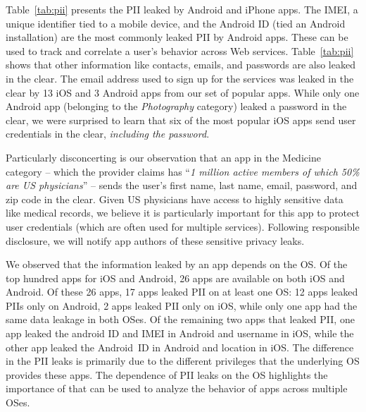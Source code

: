 Table~\ref{tab:pii} presents the PII leaked by Android and iPhone apps. 
The IMEI, a unique identifier tied to a mobile device, and the Android ID (tied an Android installation) are the most commonly leaked PII by Android apps.  
These can be used to track and correlate a user's behavior across Web services. 
Table~\ref{tab:pii} shows that other information like contacts, emails, and passwords are also leaked in the clear. 
The email address used to sign up for the services was leaked in the clear by 13 iOS and 3 Android apps from our set of popular apps.
While only one Android app (belonging to the \emph{Photography} category) leaked a password in the clear, we were surprised to learn that six of the most popular iOS apps send user credentials in the clear, \emph{including the password}. 

Particularly disconcerting is our observation that an app in the Medicine category -- which the provider claims has ``\emph{1 million active members of which 50\% are US physicians}'' -- sends the user's first name, last name, email, password, and zip code in the clear. 
Given US physicians have access to highly sensitive data like medical records, we believe it is particularly important for this app to protect user credentials (which are often used for multiple services). 
Following responsible disclosure, we will notify app authors of these sensitive privacy leaks. 

We observed that the information leaked by an app depends on the OS.
Of the top hundred apps for iOS and Android, 26 apps are available on both iOS and Android. 
Of these 26 apps, 17 apps leaked PII on at least one OS: 12 apps leaked PIIs only on Android, 2 apps leaked PII only on iOS, while only one app had the same data leakage in both OSes.
Of the remaining two apps that leaked PII, one app leaked the android ID and IMEI in Android and username in iOS, while the other app leaked the Android~ID in Android and location in iOS. 
The difference in the PII leaks is primarily due to the different privileges that the underlying OS provides these apps. 
The dependence of PII leaks on the OS highlights the importance of \meddle that can be used to analyze the behavior of apps across multiple OSes.

